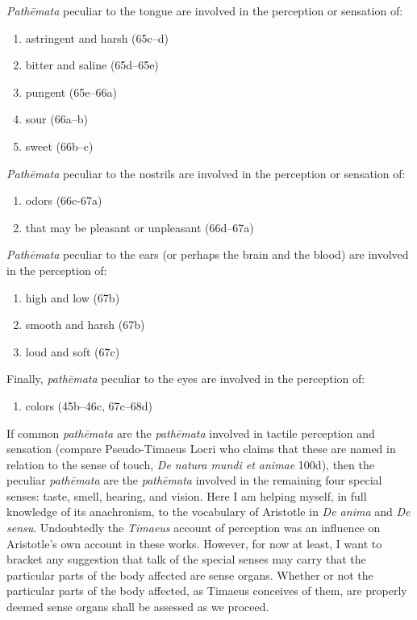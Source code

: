 \emph{Pathēmata} peculiar to the tongue are involved in the perception or sensation of:
\begin{enumerate}[(1)]
	\item astringent and harsh (65c--d)
	\item bitter and saline (65d--65e)
	\item pungent (65e--66a)
	\item sour (66a--b)
	\item sweet (66b--c)
\end{enumerate}

\emph{Pathēmata} peculiar to the nostrils are involved in the perception or sensation of:
\begin{enumerate}[(1)]
	\item odors (66c-67a)
	\item that may be pleasant or unpleasant (66d--67a)
\end{enumerate}

\emph{Pathēmata} peculiar to the ears (or perhaps the brain and the blood) are involved in the perception of:
\begin{enumerate}[(1)]
	\item high and low (67b)
	\item smooth and harsh (67b)
	\item loud and soft (67c)
\end{enumerate}

Finally, \emph{pathēmata} peculiar to the eyes are involved in the perception of:
\begin{enumerate}[(1)]
	\item colors (45b--46c, 67c--68d)
\end{enumerate}

If common \emph{pathēmata} are the \emph{pathēmata} involved in tactile perception and sensation (compare Pseudo-Timaeus Locri who claims that these are named in relation to the sense of touch, \emph{De natura mundi et animae} 100d), then the peculiar \emph{pathēmata} are the \emph{pathēmata} involved in the remaining four special senses: taste, smell, hearing, and vision. Here I am helping myself, in full knowledge of its anachronism, to the vocabulary of Aristotle in \emph{De anima} and \emph{De sensu}. Undoubtedly the \emph{Timaeus} account of perception was an influence on Aristotle's own account in these works. However, for now at least, I want to bracket any suggestion that talk of the special senses may carry that the particular parts of the body affected are sense organs. Whether or not the particular parts of the body affected, as Timaeus conceives of them, are properly deemed sense organs shall be assessed as we proceed.

